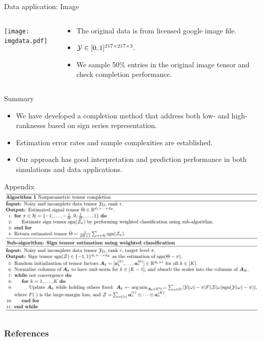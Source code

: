 \documentclass[10pt, mathserif]{beamer} %
\theoremstyle{definition}
\theoremstyle{plain}
\begin{document}
\begin{frame}{Data application: Image}
 \begin{columns}
\begin{column}{0.20\textwidth}
   \begin{center}
     \texttt{[image: imgdata.pdf]}
     \end{center}
\end{column}
\begin{column}{0.7\textwidth} 
\begin{itemize}
    \item The original data is from licensed google image file.
    \item  $\mathcal{Y}\in[0,1]^{217\times217\times3}.$ 
    \item We sample 50\% entries in the original image tensor and check completion performance.
\end{itemize}
\end{column}
\end{columns}
\end{frame}

\begin{frame}{Summary}
\begin{itemize}
    \item We have developed a completion method that address {\color{red} both low- and high-ranknesss}  based on {\color{red}sign series representation}.
    \item {\color{red}Estimation error rates }and {\color{red}sample complexities} are established.
    \item Our approach has good interpretation and prediction performance in both simulations and data applications.
\end{itemize}
    
\end{frame}



\appendix
\begin{frame}{Appendix}
    \includegraphics[width = \textwidth]{algorithm.pdf}
\end{frame}

\begin{frame}[allowframebreaks]
        \frametitle{References}
 

\end{frame}
\end{document}
